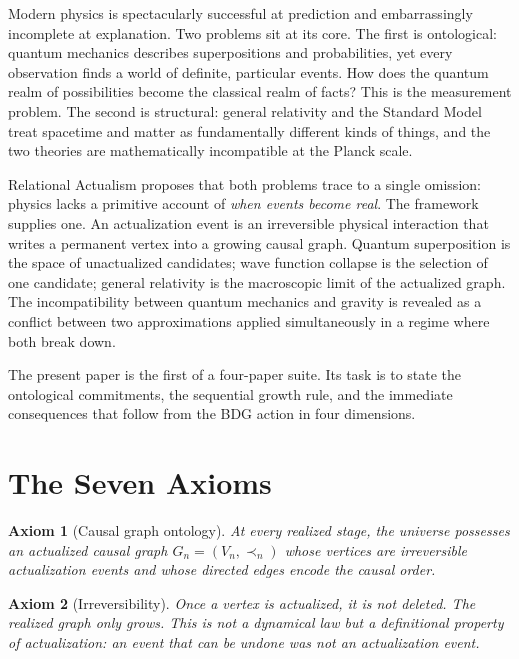 \documentclass[11pt]{article}
\newtheorem{axiom}{Axiom}
\begin{document}
Modern physics is spectacularly successful at prediction and embarrassingly incomplete at explanation. Two problems sit at its core. The first is ontological: quantum mechanics describes superpositions and probabilities, yet every observation finds a world of definite, particular events. How does the quantum realm of possibilities become the classical realm of facts? This is the measurement problem. The second is structural: general relativity and the Standard Model treat spacetime and matter as fundamentally different kinds of things, and the two theories are mathematically incompatible at the Planck scale.

Relational Actualism proposes that both problems trace to a single omission: physics lacks a primitive account of \emph{when events become real}. The framework supplies one. An actualization event is an irreversible physical interaction that writes a permanent vertex into a growing causal graph. Quantum superposition is the space of unactualized candidates; wave function collapse is the selection of one candidate; general relativity is the macroscopic limit of the actualized graph. The incompatibility between quantum mechanics and gravity is revealed as a conflict between two approximations applied simultaneously in a regime where both break down.

The present paper is the first of a four-paper suite. Its task is to state the ontological commitments, the sequential growth rule, and the immediate consequences that follow from the BDG action in four dimensions.

\section{The Seven Axioms}
\label{sec:axioms}

\begin{axiom}[Causal graph ontology]
\label{ax:graph}
At every realized stage, the universe possesses an actualized causal graph $G_n=(V_n,\prec_n)$ whose vertices are irreversible actualization events and whose directed edges encode the causal order.
\end{axiom}

\begin{axiom}[Irreversibility]
\label{ax:irrev}
Once a vertex is actualized, it is not deleted. The realized graph only grows. This is not a dynamical law but a definitional property of actualization: an event that can be undone was not an actualization event.
\end{axiom}
\end{document}
